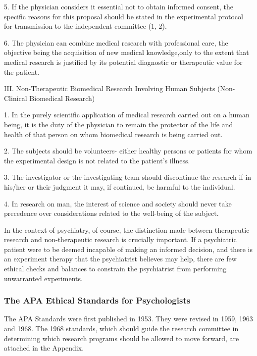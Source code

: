 {{ 5. If the physician considers it essential not to obtain informed consent, the specific reasons for this proposal should be stated in the experimental protocol for transmission to the independent committee (1, 2).

 6. The physician can combine medical research with professional care, the objective being the acquisition of new medical knowledge,only to the extent that medical research is justified by its potential diagnostic or therapeutic value for the patient.

III. Non-Therapeutic Biomedical Research Involving Human Subjects (Non-Clinical Biomedical Research)

 1. In the purely scientific application of medical research carried out on a human being, it is the duty of the physician to remain the protector of the life and health of that person on whom biomedical research is being carried out.

 2. The subjects should be volunteers- either healthy persons or patients for whom the experimental design is not related to the patient's illness.

 3. The investigator or the investigating team should discontinue the research if in his/her or their judgment it may, if continued, be harmful to the individual.

4.  In research on man, the interest of science and society should never take precedence over considerations related to the well-being of the subject.
}}

In the context of psychiatry, of course, the distinction made between therapeutic research and non-therapeutic research is crucially important. If a psychiatric patient were to be deemed incapable of making an informed decision, and there is an experiment therapy that the psychiatrist believes may help, there are few ethical checks and balances to constrain the psychiatrist from performing unwarranted experiments.

\subsubsection{The APA Ethical Standards for Psychologists}
\label{theapaethicalstandardsforpsychologists}

The APA Standards were first published in 1953. They were revised in 1959, 1963 and 1968. The 1968 standards, which should guide the research committee in determining which research programs should be allowed to move forward, are attached in the Appendix.

